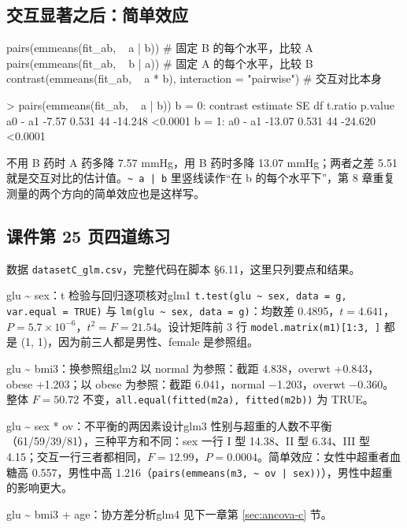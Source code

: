 \subsection{交互显著之后：简单效应}
\begin{RCode}
pairs(emmeans(fit_ab, ~ a | b))     # 固定 B 的每个水平，比较 A
pairs(emmeans(fit_ab, ~ b | a))     # 固定 A 的每个水平，比较 B
contrast(emmeans(fit_ab, ~ a * b), interaction = "pairwise")   # 交互对比本身
\end{RCode}
\begin{ROut}
> pairs(emmeans(fit_ab, ~ a | b))
b = 0:
 contrast estimate    SE df t.ratio p.value
 a0 - a1     -7.57 0.531 44 -14.248 <0.0001
b = 1:
 a0 - a1    -13.07 0.531 44 -24.620 <0.0001
\end{ROut}
不用 B 药时 A 药多降 7.57 mmHg，用 B 药时多降 13.07 mmHg；两者之差 5.51 就是交互对比的估计值。\Verb!~ a | b! 里竖线读作“在 b 的每个水平下”，第 8 章重复测量的两个方向的简单效应也是这样写。

\subsection{课件第 25 页四道练习}
数据 \Verb|datasetC_glm.csv|，完整代码在脚本 §6.11，这里只列要点和结果。

\begin{exercisebox}{glu \textasciitilde{} sex：t 检验与回归逐项核对}{glm1}
\Verb|t.test(glu ~ sex, data = g, var.equal = TRUE)| 与 \Verb|lm(glu ~ sex, data = g)|：均数差 0.4895，$t=4.641$，$P=5.7\times10^{-6}$，$t^2=F=21.54$。设计矩阵前 3 行 \Verb|model.matrix(m1)[1:3, ]| 都是 (1, 1)，因为前三人都是男性、female 是参照组。
\end{exercisebox}

\begin{exercisebox}{glu \textasciitilde{} bmi3：换参照组}{glm2}
以 normal 为参照：截距 4.838，overwt +0.843，obese +1.203；以 obese 为参照：截距 6.041，normal −1.203，overwt −0.360。整体 $F=50.72$ 不变，\Verb|all.equal(fitted(m2a), fitted(m2b))| 为 TRUE。
\end{exercisebox}

\begin{exercisebox}{glu \textasciitilde{} sex * ov：不平衡的两因素设计}{glm3}
性别与超重的人数不平衡（61/59/39/81），三种平方和不同：sex 一行 I 型 14.38、II 型 6.34、III 型 4.15；交互一行三者都相同，$F=12.99$，$P=0.0004$。简单效应：女性中超重者血糖高 0.557，男性中高 1.216（\Verb!pairs(emmeans(m3, ~ ov | sex))!），男性中超重的影响更大。
\end{exercisebox}

\begin{exercisebox}{glu \textasciitilde{} bmi3 + age：协方差分析}{glm4}
见下一章第 \ref{sec:ancova-c} 节。
\end{exercisebox}
